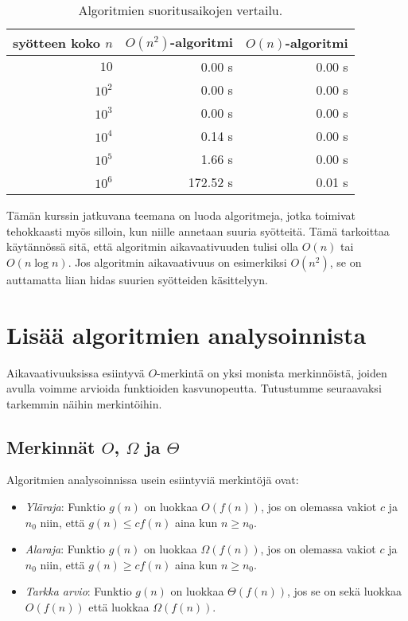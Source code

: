 \begin{table}
\center
\begin{tabular}{rrr}
syötteen koko $n$ & $O(n^2)$-algoritmi & $O(n)$-algoritmi \\
\hline
$10$ & 0.00 s & 0.00 s\\
$10^2$ & 0.00 s & 0.00 s\\
$10^3$ & 0.00 s & 0.00 s\\
$10^4$ & 0.14 s & 0.00 s \\
$10^5$ & 1.66 s & 0.00 s \\
$10^6$ & 172.52 s & 0.01 s \\
\end{tabular}
\caption{Algoritmien suoritusaikojen vertailu.}
\label{tab:algver}
\end{table}

Tämän kurssin jatkuvana teemana on luoda algoritmeja,
jotka toimivat tehokkaasti myös silloin, kun niille annetaan suuria syötteitä.
Tämä tarkoittaa käytännössä sitä, että algoritmin aikavaativuuden tulisi
olla $O(n)$ tai $O(n \log n)$.
Jos algoritmin aikavaativuus on esimerkiksi $O(n^2)$,
se on auttamatta liian hidas suurien syötteiden käsittelyyn.

\section{Lisää algoritmien analysoinnista}

Aikavaativuuksissa esiintyvä $O$-merkintä on yksi monista merkinnöistä,
joiden avulla voimme arvioida funktioiden kasvunopeutta.
Tutustumme seuraavaksi tarkemmin näihin merkintöihin.

\subsection{Merkinnät $O$, $\Omega$ ja $\Theta$}

Algoritmien analysoinnissa usein esiintyviä merkintöjä ovat:

\begin{itemize}
\item \emph{Yläraja}: Funktio $g(n)$ on luokkaa $O(f(n))$, jos on olemassa vakiot $c$ ja $n_0$
niin, että $g(n) \le c f(n)$ aina kun $n \ge n_0$.
\item \emph{Alaraja}: Funktio $g(n)$ on luokkaa $\Omega(f(n))$, jos on olemassa vakiot $c$ ja $n_0$
niin, että $g(n) \ge c f(n)$ aina kun $n \ge n_0$.
\item \emph{Tarkka arvio}: Funktio $g(n)$ on luokkaa $\Theta(f(n))$, jos se on sekä luokkaa $O(f(n))$
että luokkaa $\Omega(f(n))$.
\end{itemize}

